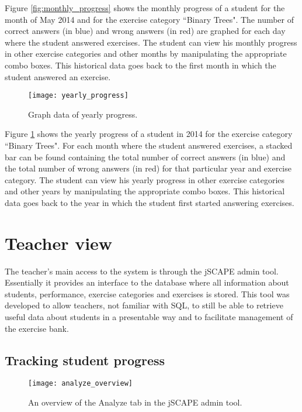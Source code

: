 Figure \ref{fig:monthly_progress} shows the monthly progress of a student for the month of May 2014 and for the exercise category ``Binary Trees". The number of correct answers (in blue) and wrong answers (in red) are graphed for each day where the student answered exercises. The student can view his monthly progress in other exercise categories and other months by manipulating the appropriate combo boxes. This historical data goes back to the first month in which the student answered an exercise.

\begin{figure}[H]
\centering
\texttt{[image: yearly\_progress]}
\caption{Graph data of yearly progress.}
\label{fig:yearly_progress}
\end{figure}

Figure \ref{fig:yearly_progress} shows the yearly progress of a student in 2014 for the exercise category ``Binary Trees". For each month where the student answered exercises, a stacked bar can be found containing the total number of correct answers (in blue) and the total number of wrong answers (in red) for that particular year and exercise category. The student can view his yearly progress in other exercise categories and other years by manipulating the appropriate combo boxes. This historical data goes back to the year in which the student first started answering exercises.

\section{Teacher view}
The teacher's main access to the system is through the jSCAPE admin tool. Essentially it provides an interface to the database where all information about students, performance, exercise categories and exercises is stored. This tool was developed to allow teachers, not familiar with SQL, to still be able to retrieve useful data about students in a presentable way and to facilitate management of the exercise bank.

\subsection{Tracking student progress}
\begin{figure}[H]
\centering
\texttt{[image: analyze\_overview]}
\caption{An overview of the Analyze tab in the jSCAPE admin tool.}
\label{fig:analyze_overview}
\end{figure}

